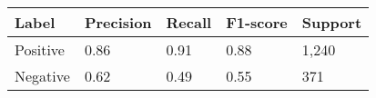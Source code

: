 \begin{tabular}{lllll}
\midrule
\textbf{Label}      & \textbf{Precision} & \textbf{Recall}  & \textbf{F1-score}    & \textbf{Support}    \\
\midrule
Positive            & 0.86               & 0.91             & 0.88                  & 1,240        \\
Negative            & 0.62               & 0.49             & 0.55                  & 371        \\
\midrule
\end{tabular}


